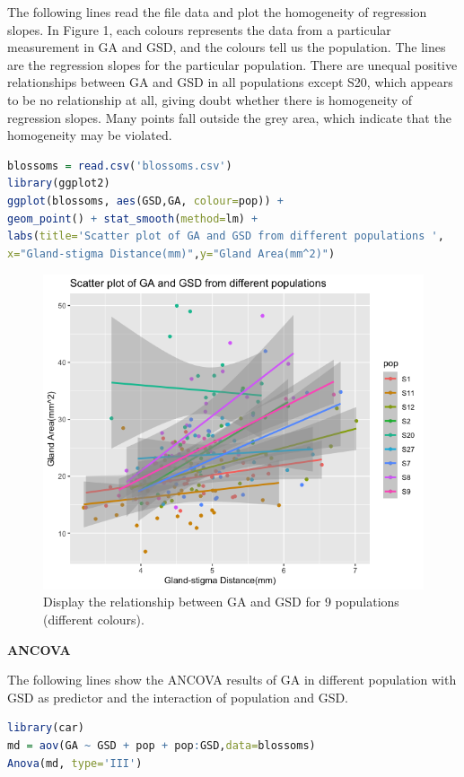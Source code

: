 \documentclass{article}
\begin{document}
The following lines read the file data and plot the homogeneity of regression slopes.
In Figure 1, each colours represents the data from a particular measurement in GA and GSD, and the colours tell us the population. The lines are the regression slopes for the particular population. There are unequal positive relationships between GA and GSD in all populations except S20, which appears to be no relationship at all, giving doubt whether there is homogeneity of regression slopes. Many points fall outside the grey area, which indicate that the homogeneity may be violated.\\
\begin{lstlisting}[language=R]
blossoms = read.csv('blossoms.csv')
library(ggplot2)
ggplot(blossoms, aes(GSD,GA, colour=pop)) + 
geom_point() + stat_smooth(method=lm) + 
labs(title='Scatter plot of GA and GSD from different populations ',
x="Gland-stigma Distance(mm)",y="Gland Area(mm^2)")
\end{lstlisting}
\begin{figure}
    \includegraphics[width=\linewidth]{scatterplot.png}
    \caption{Display the relationship between GA and GSD for 9 populations (different colours).}
    \label{fig:my_label}
\end{figure}\break
\textbf{ANCOVA\\}

The following lines show the ANCOVA results of GA in different population with GSD as predictor and the interaction of population and GSD. \\
\begin{lstlisting}[language=R]
library(car)
md = aov(GA ~ GSD + pop + pop:GSD,data=blossoms)
Anova(md, type='III')
\end{lstlisting}

\end{document}
